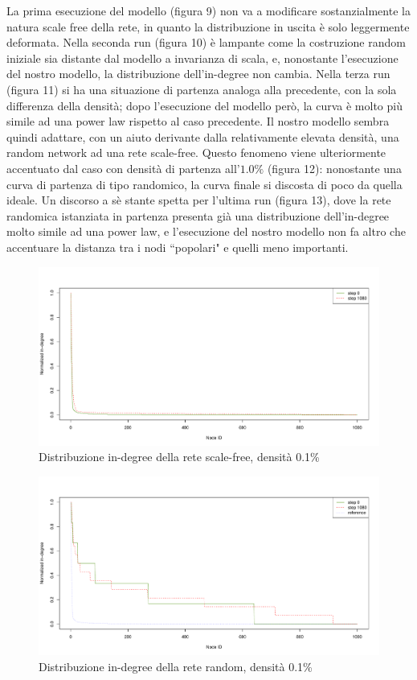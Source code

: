 \documentclass[a4paper,12pt]{article}
\begin{document}
La prima esecuzione del modello (figura 9) non va a modificare sostanzialmente la natura scale free della rete, in quanto la distribuzione in uscita è solo leggermente deformata. Nella seconda run (figura 10) è lampante come la costruzione random iniziale sia distante dal modello a invarianza di scala, e, nonostante l'esecuzione del nostro modello, la distribuzione dell'in-degree non cambia. Nella terza run (figura 11) si ha una situazione di partenza analoga alla precedente, con la sola differenza della densità; dopo l'esecuzione del modello però, la curva è molto più simile ad una power law rispetto al caso precedente. Il nostro modello sembra quindi adattare, con un aiuto derivante dalla relativamente elevata densità, una random network ad una rete scale-free. Questo fenomeno viene ulteriormente accentuato dal caso con densità di partenza all'$1.0\%$ (figura 12): nonostante una curva di partenza di tipo randomico, la curva finale si discosta di poco da quella ideale. Un discorso a sè stante spetta per l'ultima run (figura 13), dove la rete randomica istanziata in partenza presenta già una distribuzione dell'in-degree molto simile ad una power law, e l'esecuzione del nostro modello non fa altro che accentuare la distanza tra i nodi ``popolari" e quelli meno importanti.
\begin{figure}[H]
\centering
\includegraphics[scale=0.5]{images/dist_1000_sf_1080_0.pdf}
\caption{Distribuzione in-degree della rete scale-free, densità 0.1\%}
\end{figure}
\begin{figure}[H]
\centering
\includegraphics[scale=0.5]{images/dist_1000_rnd_1080_01_0.pdf}
\caption{Distribuzione in-degree della rete random, densità 0.1\%}
\end{figure}
\end{document}
